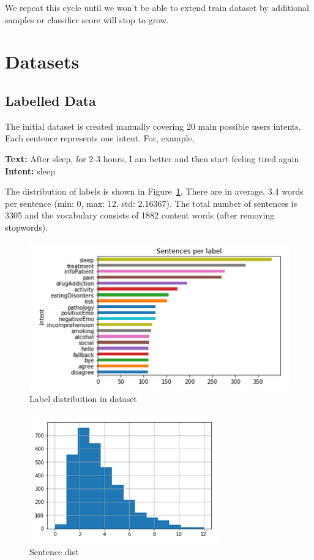 \documentclass[11pt]{article}
\begin{document}
We repeat this cycle until we won't be able to extend train dataset by additional samples or classifier score will stop to grow.

\section{Datasets}

\subsection{Labelled Data}

The initial dataset is created manually covering 20 main possible users intents. Each sentence represents one intent. For, example,

\textbf{Text:} After sleep, for 2-3 hours, I am better and then start feeling tired again\\
\textbf{Intent:} sleep

The distribution of labels is shown in Figure~\ref{figure:name}. There
are in average, 3.4 words per sentence (min: 0, max: 12, std:
2.16367).  The total number of sentences is 3305 and the vocabulary
consists of 1882 content words (after removing stopwords).

 \begin{figure}[h]
 	\centering
 	\includegraphics[scale=0.5]{report1.png}
	\caption{Label distribution in dataset}
 \label{figure:name}
 \end{figure}
\FloatBarrier



 \begin{figure}[h]
 	\centering
 	\includegraphics[scale=0.4]{report4.png}
	\caption{Sentence dist}
 \label{words_freq}
 \end{figure}
 \FloatBarrier
\end{document}
